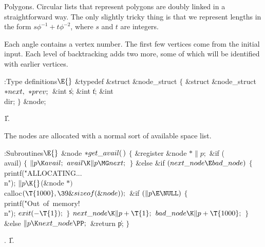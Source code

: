 Polygons. Circular lists that represent polygons
are doubly linked in a straightforward way.
The only slightly tricky thing is that we represent lengths in the
form $s\phi^{-1}+t\phi^{-2}$, where $s$ and $t$ are integers.

Each angle contains a vertex number. The first few vertices come from
the initial input. Each level of backtracking adds two more, some of
which will be identified with earlier vertices.

\Y\B\4:Type definitions\X${}\E{}$\6
\&{typedef} \&{struct} \&{node\_struct} ${}\{{}$\1\6
\&{struct} \&{node\_struct} ${}{*}\\{next},{}$ ${}{*}\\{prev};{}$\6
\&{int} \|s;\6
\&{int} \|t;\6
\&{int} \\{dir};\2\6
${}\}{}$ \&{node};\par
\U1.\fi

The nodes are allocated with a normal sort of available space list.

\Y\B\4:Subroutines\X${}\E{}$\6
\&{node} ${}{*}\\{get\_avail}(\,){}$\1\1\2\2\6
${}\{{}$\1\6
\&{register} \&{node} ${}{*}\|p;{}$\7
\&{if} (\\{avail})\5
${}\{{}$\1\6
${}\|p\K\\{avail};{}$\6
${}\\{avail}\K\|p\MG\\{next};{}$\6
\4${}\}{}$\2\6
\&{else} \&{if} ${}(\\{next\_node}\E\\{bad\_node}){}$\5
${}\{{}$\1\6
\\{printf}(\.{"ALLOCATING...\\n"});\6
${}\|p\K{}$(\&{node} ${}{*}){}$ \\{calloc}${}(\T{1000},\39\&{sizeof}(%
\&{node}));{}$\6
\&{if} ${}(\|p\E\NULL){}$\5
${}\{{}$\1\6
\\{printf}(\.{"Out\ of\ memory!\\n"});\6
${}\\{exit}({-}\T{1});{}$\6
\4${}\}{}$\2\6
${}\\{next\_node}\K\|p+\T{1};{}$\6
${}\\{bad\_node}\K\|p+\T{1000};{}$\6
\4${}\}{}$\2\6
\&{else}\1\5
${}\|p\K\\{next\_node}\PP;{}$\2\6
\&{return} \|p;\6
\4${}\}{}$\2\par
{}.
\U1.\fi

